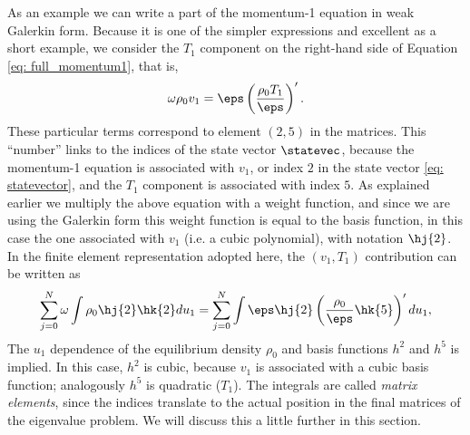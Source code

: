 As an example we can write a part of the momentum-1 equation in weak Galerkin form. Because it is one of the simpler expressions and excellent as a short example, we consider the $T_1$ component on the right-hand side of Equation \eqref{eq: full_momentum1}, that is,
\begin{equation}
  \omega \rho_0 v_1 = \eps \left(\frac{\rho_0 T_1}{\eps}\right)'.
\end{equation}
These particular terms correspond to element $(2, 5)$ in the matrices. This ``number'' links to the indices of the state vector $\statevec$, because the momentum-1 equation is associated with $v_1$, or index $2$ in the state vector \eqref{eq: statevector}, and the $T_1$ component is associated with index $5$. As explained earlier we multiply the above equation with a weight function, and since we are using the Galerkin form this weight function is equal to the basis function, in this case the one associated with $v_1$ (i.e. a cubic polynomial), with notation $\hj{2}$. In the finite element representation adopted here, the $(v_1, T_1)$ contribution can be written as
\begin{equation} \label{eq: example_rho1_T1}
  \sum_{j=0}^N\omega \int \rho_0 \hj{2}\hk{2}du_1 =
  \sum_{j=0}^N\int \eps \hj{2}\left(\frac{\rho_0}{\eps}\hk{5}\right)'du_1,
\end{equation}
The $u_1$ dependence of the equilibrium density $\rho_0$ and basis functions $h^2$ and $h^5$ is implied. In this case, $h^2$ is cubic, because $v_1$ is associated with a cubic basis function; analogously $h^5$ is quadratic ($T_1$). The integrals are called \emph{matrix elements}, since the indices translate to the actual position in the final matrices of the eigenvalue problem. We will discuss this a little further in this section.

